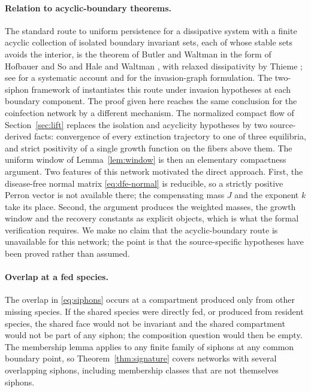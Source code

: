 \documentclass[11pt,a4paper]{article}
\theoremstyle{plain}
\theoremstyle{definition}
\theoremstyle{remark}
\begin{document}
\paragraph{Relation to acyclic-boundary theorems.}
The standard route to uniform persistence for a dissipative system with a finite acyclic collection of isolated boundary invariant sets, each of whose stable sets avoids the interior, is the theorem of Butler and Waltman \citep{ButlerWaltman1986} in the form of Hofbauer and So \citep{HofbauerSo1989} and Hale and Waltman \citep{HaleWaltman1989}, with relaxed dissipativity by Thieme \citep{Thieme1993}; see \citep{SmithThieme2011} for a systematic account and \citep{HofbauerSchreiber2022} for the invasion-graph formulation. The two-siphon framework of \citep{AdenaneAvramHalanay2026} instantiates this route under invasion hypotheses at each boundary component. The proof given here reaches the same conclusion for the coinfection network by a different mechanism. The normalized compact flow of Section~\ref{sec:lift} replaces the isolation and acyclicity hypotheses by two source-derived facts: convergence of every extinction trajectory to one of three equilibria, and strict positivity of a single growth function on the fibers above them. The uniform window of Lemma~\ref{lem:window} is then an elementary compactness argument. Two features of this network motivated the direct approach. First, the disease-free normal matrix \eqref{eq:dfe-normal} is reducible, so a strictly positive Perron vector is not available there; the compensating mass $J$ and the exponent $k$ take its place. Second, the argument produces the weighted masses, the growth window and the recovery constants as explicit objects, which is what the formal verification requires. We make no claim that the acyclic-boundary route is unavailable for this network; the point is that the source-specific hypotheses have been proved rather than assumed.

\paragraph{Overlap at a fed species.}
The overlap in \eqref{eq:siphons} occurs at a compartment produced only from other missing species. If the shared species were directly fed, or produced from resident species, the shared face would not be invariant and the shared compartment would not be part of any siphon; the composition question would then be empty. The membership lemma applies to any finite family of siphons at any common boundary point, so Theorem~\ref{thm:signature} covers networks with several overlapping siphons, including membership classes that are not themselves siphons.
\end{document}
